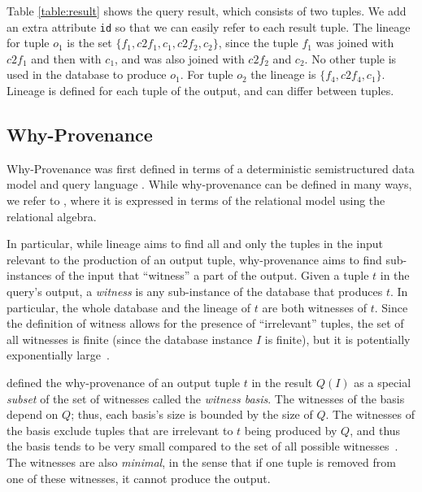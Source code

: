 Table \ref{table:result} shows the query result, which consists of two tuples. We add an extra  attribute \texttt{id} so that we can easily refer to each result tuple.  
The lineage for tuple $o_1$ is the set $\{f_1, c2f_1, c_1, c2f_2, c_2\}$, since the tuple $f_1$ was joined with $c2f_1$ and then with $c_1$, and was also joined with $c2f_2$ and $c_2$. No other tuple is used in the database to produce $o_1$.
For tuple $o_2$ the lineage is $\{ f_4, c2f_4, c_1\}$.
Lineage is defined for each tuple of the output, and can differ between tuples.

\subsection{Why-Provenance}
Why-Provenance was first defined in terms of a deterministic semistructured data model and query language \citep{WhyProvBuneman}. 
While why-provenance can be defined in many ways, we refer to \citep{CheneyProvSurvey}, where it is expressed in terms of the relational model using the relational algebra.

In particular, while lineage aims to find all and only the tuples in the input relevant to the production of an output tuple, why-provenance aims to find sub-instances of the input that ``witness'' a part of the output. 
Given a tuple $t$ in the query's output, a \emph{witness} is any sub-instance of the database that produces $t$.
In particular, the whole database and the lineage of $t$ are both witnesses of $t$.
Since the definition of witness allows for the presence of ``irrelevant'' tuples, the set of all witnesses is finite (since the database instance $I$ is finite), but it is potentially exponentially large~\citep{CheneyProvSurvey}.

\citet{WhyProvBuneman} defined the why-provenance of an output tuple $t$ in the result $Q(I)$ as a special \emph{subset} of the set of witnesses called the \emph{witness basis}.
The witnesses of the basis depend on $ Q $; thus, each basis's size is bounded by the size of $ Q $. The witnesses of the basis exclude tuples that are irrelevant to $t$ being produced by $Q$, and thus the basis tends to be very small compared to the set of all possible witnesses~\citep{CheneyProvSurvey}.
The witnesses are also {\em minimal}, in the sense that if one tuple is removed from one of these witnesses, it cannot produce the output. %


